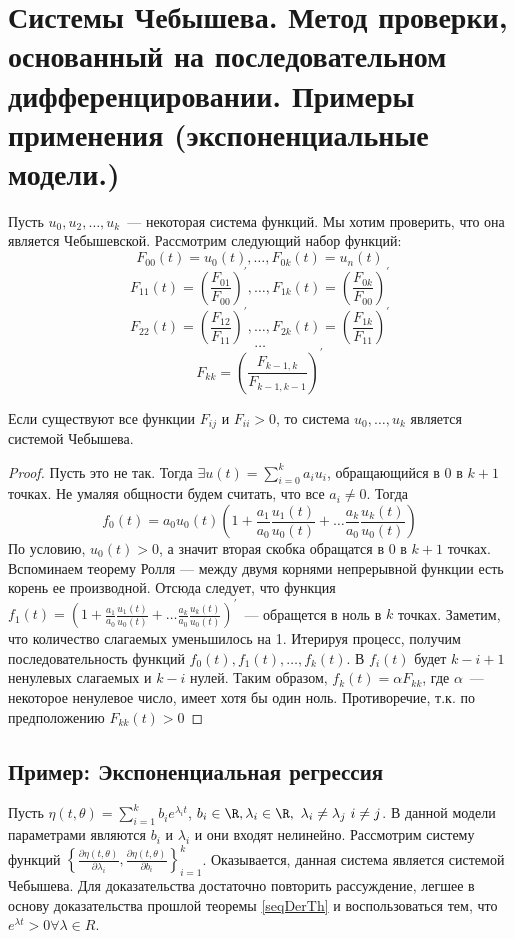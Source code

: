
\section{Системы Чебышева. Метод проверки, основанный на последовательном дифференцировании. Примеры применения (экспоненциальные модели.)}

Пусть $u_0, u_2,…, u_k$ — некоторая система функций. Мы хотим проверить, что она является Чебышевской. 
Рассмотрим следующий набор функций:
$$ F_{00}(t) = u_0(t), …, F_{0k}(t) = u_n(t)$$
$$F_{11}(t) = \left(\frac{F_{01}}{F_{00}}\right)^{'}, …, F_{1k}(t) = \left(\frac{F_{0k}}{F_{00}}\right)^{'}$$
$$F_{22}(t) = \left(\frac{F_{12}}{F_{11}}\right)^{'}, …, F_{2k}(t) = \left(\frac{F_{1k}}{F_{11}}\right)^{'} $$
$$ … $$
$$F_{kk} = \left(\frac{F_{k-1, k}}{F_{k-1, k-1}}\right)^{'}$$
\begin{thm}
\label{seqDerTh}
Если существуют все функции $F_{ij}$ и $F_{ii} > 0$, то система $u_0, …, u_k$ является системой Чебышева.
\end{thm}
\begin{proof}
Пусть это не так. Тогда $\exists u(t) = \sum \limits_{i=0}^{k} a_i u_i$, обращающийся в 0 в $k+1$ точках. Не умаляя общности будем считать, что все $a_i \neq 0$. Тогда 
$$ f_0(t) = a_0u_0(t)\left(1 + \frac{a_1}{a_0} \frac{u_1(t)}{u_0(t)} + … \frac{a_k}{a_0}\frac{u_k(t)}{u_0(t)}\right)$$
По условию, $u_0(t) > 0$, а значит вторая скобка обращатся в 0 в $k+1$ точках. Вспоминаем теорему Ролля — между двумя корнями непрерывной функции есть корень ее производной. Отсюда следует, что функция 
$f_1(t) = \left(1 + \frac{a_1}{a_0} \frac{u_1(t)}{u_0(t)} + … \frac{a_k}{a_0}\frac{u_k(t)}{u_0(t)}\right)^{'}$ — обращется в ноль в $k$ точках. Заметим, что количество слагаемых уменьшилось на 1. Итерируя процесс, получим 
последовательность функций $f_0(t), f_1(t), …, f_k(t)$. В $f_i(t)$ будет $k-i+1$ ненулевых слагаемых и $k-i$ нулей. Таким образом, $f_k(t) = \alpha F_{kk}$, где $\alpha$ — некоторое ненулевое число, имеет хотя бы один ноль. Противоречие, т.к. по предположению $F_{kk}(t) > 0$
\end{proof}
\subsection{Пример: Экспоненциальная регрессия}
Пусть $\eta(t, \theta) = \sum\limits_{i=1}^k b_i e^{\lambda_it}$, $b_i \in \R, \lambda_i \in \R, \lambda_i \neq \lambda_j i \neq j$. В данной модели параметрами являются $b_i$ и $\lambda_i$ и они входят нелинейно. Рассмотрим систему функций 
$\left\{ \frac{\partial \eta(t, \theta)}{\partial \lambda_i}, \frac{\partial \eta(t, \theta)}{\partial b_i} \right\}_{i=1}^{k}$. Оказывается, данная система является системой Чебышева. Для доказательства достаточно повторить рассуждение, легшее в основу доказательства прошлой теоремы \eqref{seqDerTh} и воспользоваться тем, что $e^{\lambda t} > 0 \forall \lambda \in R$.

